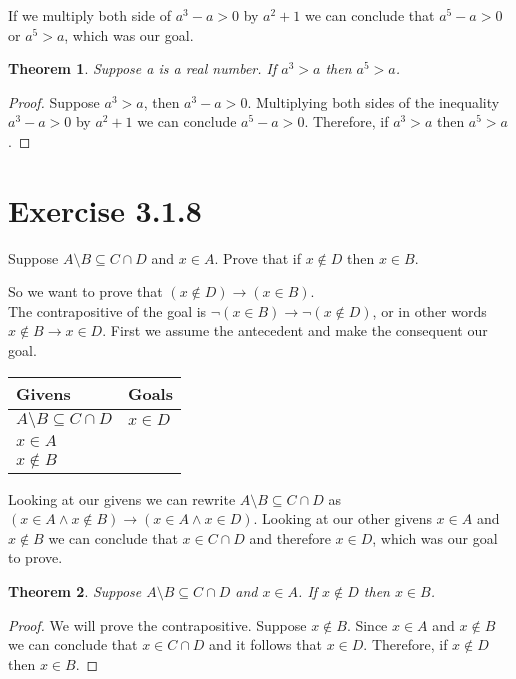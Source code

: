 \documentclass{article}
\newcommand{\n}{ \noindent }
\newtheorem*{theorem}{Theorem}  %
\begin{document}
\n If we multiply both side of $a^3 - a > 0$ by $a^2+1$ we can conclude that $a^5-a>0$ or $a^5>a$, which was our goal.

\begin{theorem} Suppose a is a real number. If $a^3>a$ then $a^5>a$.
\end{theorem}

\begin{proof}
Suppose $a^3>a$, then $a^3 - a > 0$. Multiplying both sides of the inequality $a^3-a>0$ by $a^2+1$ we can conclude $a^5-a>0$. Therefore, if $a^3>a$ then $a^5>a$.
\end{proof}

\section*{Exercise 3.1.8}
Suppose $A \setminus B \subseteq C \cap D$ and $x \in A$. Prove that if $x \notin D$ then $x \in B$.

\n So we want to prove that 
$(x \notin D) \rightarrow (x \in B)$. \\

\n The contrapositive of the goal is $\neg(x \in B) \rightarrow \neg(x \notin D)$, or in other words $x \notin B \rightarrow x \in D$. First we assume the antecedent and make the consequent our goal.

\begin{table}[h]
\begin{tabular}{ll}
\hline
Givens & Goals   \\ \hline
$A \setminus B \subseteq C \cap D$ & $x \in D$ \\
$x \in A$ & \\
$x \notin B$ &   \\ \hline
\end{tabular}
\end{table}

\n Looking at our givens we can rewrite $A \setminus B \subseteq C \cap D$ as $(x \in A \wedge x \notin B) \rightarrow (x \in A \wedge x \in D)$. Looking at our other givens $x \in A$ and $x \notin B$ we can conclude that $x \in C \cap D$ and therefore $x \in D$, which was our goal to prove.

\begin{theorem} Suppose $A \setminus B \subseteq C \cap D$ and $x \in A$. If $x \notin D$ then $x \in B$.
\end{theorem}
\begin{proof}
We will prove the contrapositive. Suppose $x \notin B$. Since $x \in A$ and $x \notin B$ we can conclude that $x \in C \cap D$ and it follows that $x \in D$. Therefore, if $x\notin D$ then $x \in B$.
\end{proof}
\end{document}
